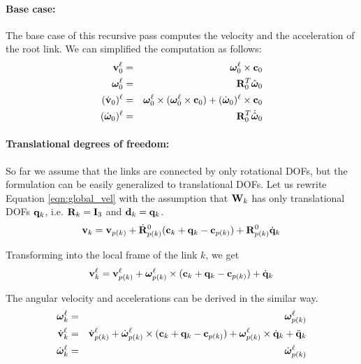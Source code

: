 \paragraph{Base case:} The base case of this recursive pass computes
the velocity and the acceleration of the root link. We can simplified
the computation as follows:
\begin{eqnarray}
\mathbf{v}_0^\ell &=& \bm{\omega}_0^\ell \times \mathbf{c}_0 \nonumber \\
\bm{\omega}_0^\ell& =& \mathbf{R}_0^T \hat{\bm{\omega}}_0 \nonumber \\
(\dot{\mathbf{v}}_0)^\ell &=& \bm{\omega}_0^\ell \times (\bm{\omega}_0^\ell
\times \mathbf{c}_0) + (\dot{\bm{\omega}}_0)^\ell \times \mathbf{c}_0 \nonumber \\
(\dot{\bm{\omega}}_0)^\ell &=& \mathbf{R}_0^T \dot{\hat{\bm{\omega}}}_0
\end{eqnarray}

\paragraph{Translational degrees of freedom:}
So far we assume that the links are connected by only rotational DOFs,
but the formulation can be easily generalized to translational
DOFs. Let us rewrite Equation \ref{eqn:global_vel} with the assumption
that $\mathbf{W}_k$ has only translational DOFs $\mathbf{q}_k$, i.e. $\mathbf{R}_k
= \mathbf{I}_3$ and $\mathbf{d}_k = \mathbf{q}_k$.
\begin{equation}
\mathbf{v}_k = \mathbf{v}_{p(k)} + \dot{\mathbf{R}}^0_{p(k)} (\mathbf{c}_k
+ \mathbf{q}_k - \mathbf{c}_{p(k)}) +\mathbf{R}^0_{p(k)} \dot{\mathbf{q}}_k 
\end{equation}

Transforming into the local frame of the link $k$, we get
\begin{equation}
\mathbf{v}_k^\ell = \mathbf{v}_{p(k)}^\ell + \bm{\omega}_{p(k)}^\ell \times (\mathbf{c}_k + \mathbf{q}_k - \mathbf{c}_{p(k)}) + \dot{\mathbf{q}}_k
\end{equation}

The angular velocity and accelerations can be derived in the similar
way.
\begin{eqnarray}
\bm{\omega}_k^\ell &=& \bm{\omega}_{p(k)}^\ell \nonumber \\
\dot{\mathbf{v}}_k^\ell &=& \dot{\mathbf{v}}_{p(k)}^\ell +
\dot{\bm{\omega}}_{p(k)}^\ell \times (\mathbf{c}_k + \mathbf{q}_k -
\mathbf{c}_{p(k)}) + \bm{\omega}_{p(k)}^\ell \times \dot{\mathbf{q}}_k +
\ddot{\mathbf{q}}_k \nonumber \\
\dot{\bm{\omega}}_k^\ell &=& \dot{\bm{\omega}}_{p(k)}^\ell
\end{eqnarray}

